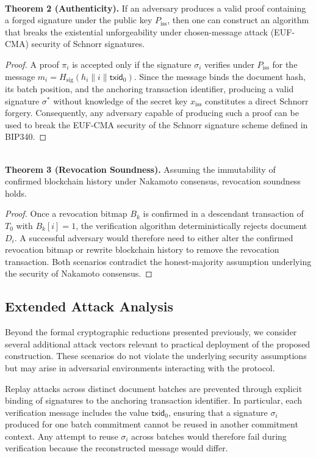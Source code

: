 \documentclass[preprint,12pt]{elsarticle}
\begin{document}
\textbf{\\Theorem 2 (Authenticity).}  
If an adversary produces a valid proof containing a forged signature under the public key $P_{\mathrm{iss}}$, then one can construct an algorithm that breaks the existential unforgeability under chosen-message attack (EUF-CMA) security of Schnorr signatures.

 \begin{proof} 

A proof $\pi_i$ is accepted only if the signature $\sigma_i$ verifies under $P_{\mathrm{iss}}$ for the message $m_i = H_{\mathrm{sig}}(h_i \parallel i \parallel \mathsf{txid}_0)$. Since the message binds the document hash, its batch position, and the anchoring transaction identifier, producing a valid signature $\sigma^*$ without knowledge of the secret key $x_{\mathrm{iss}}$ constitutes a direct Schnorr forgery. Consequently, any adversary capable of producing such a proof can be used to break the EUF-CMA security of the Schnorr signature scheme defined in BIP340.
\end{proof} 

\textbf{\\Theorem 3 (Revocation Soundness).}  
Assuming the immutability of confirmed blockchain history under Nakamoto consensus, revocation soundness holds.
\begin{proof} 
Once a revocation bitmap $B_k$ is confirmed in a descendant transaction of $T_0$ with $B_k[i] = 1$, the verification algorithm deterministically rejects document $D_i$. A successful adversary would therefore need to either alter the confirmed revocation bitmap or rewrite blockchain history to remove the revocation transaction. Both scenarios contradict the honest-majority assumption underlying the security of Nakamoto consensus. 
\end{proof}

\subsection{Extended Attack Analysis}

Beyond the formal cryptographic reductions presented previously, we consider several additional attack vectors relevant to practical deployment of the proposed construction. These scenarios do not violate the underlying security assumptions but may arise in adversarial environments interacting with the protocol.

Replay attacks across distinct document batches are prevented through explicit binding of signatures to the anchoring transaction identifier. In particular, each verification message includes the value $\mathsf{txid}_0$, ensuring that a signature $\sigma_i$ produced for one batch commitment cannot be reused in another commitment context. Any attempt to reuse $\sigma_i$ across batches would therefore fail during verification because the reconstructed message would differ.
\end{document}
